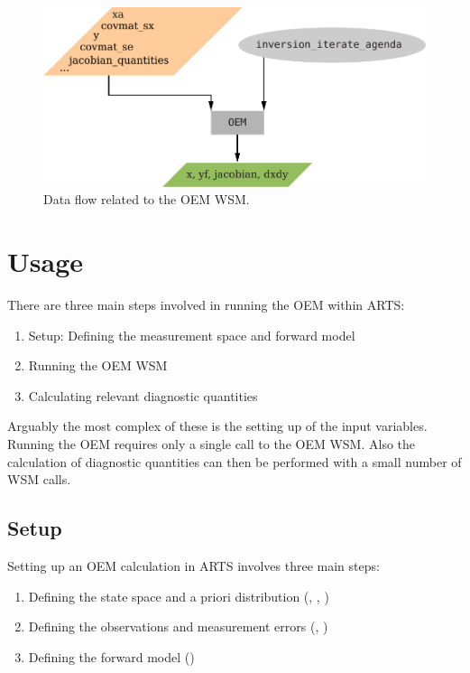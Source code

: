 \begin{figure}[!h]
  \begin{center}
   \includegraphics*[width=0.75\hsize, angle=0]{oem_flow}
  \end{center}
  \caption[OEM]{Data flow related to the OEM WSM.}
 \label{fig:oem_flow}
\end{figure}

\section{Usage}

There are three main steps involved in running the OEM within ARTS:
\begin{enumerate}
 \item Setup: Defining the measurement space and forward model
 \item Running the OEM WSM
 \item Calculating relevant diagnostic quantities
\end{enumerate}

Arguably the most complex of these is the setting up of the input variables.
Running the OEM requires only a single call to the OEM WSM. Also the calculation
of diagnostic quantities can then be performed with a small number of WSM calls.

\subsection{Setup}

Setting up an OEM calculation in ARTS involves three main steps:
\begin{enumerate}
  \item Defining the state space and a priori distribution (,
, )
  \item Defining the observations and measurement errors (, )
  \item Defining the forward model ()
\end{enumerate}

